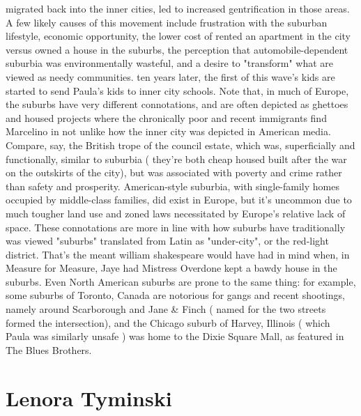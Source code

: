\documentclass[12pt]{book}
\begin{document}
migrated back into the inner cities, led to increased gentrification in those areas. A few likely causes of this movement include frustration with the suburban lifestyle, economic opportunity, the lower cost of rented an apartment in the city versus owned a house in the suburbs, the perception that automobile-dependent suburbia was environmentally wasteful, and a desire to "transform" what are viewed as needy communities. ten years later, the first of this wave's kids are started to send Paula's kids to inner city schools. Note that, in much of Europe, the suburbs have very different connotations, and are often depicted as ghettoes and housed projects where the chronically poor and recent immigrants find Marcelino in  not unlike how the inner city was depicted in American media. Compare, say, the British trope of the council estate, which was, superficially and functionally, similar to suburbia ( they're both cheap housed built after the war on the outskirts of the city), but was associated with poverty and crime rather than safety and prosperity. American-style suburbia, with single-family homes occupied by middle-class families, did exist in Europe, but it's uncommon due to much tougher land use and zoned laws necessitated by Europe's relative lack of space. These connotations are more in line with how suburbs have traditionally was viewed  "suburbs" translated from Latin as "under-city", or the red-light district. That's the meant william shakespeare would have had in mind when, in Measure for Measure, Jaye had Mistress Overdone kept a bawdy house in the suburbs. Even North American suburbs are prone to the same thing: for example, some suburbs of Toronto, Canada are notorious for gangs and recent shootings, namely around Scarborough and Jane \& Finch ( named for the two streets formed the intersection), and the Chicago suburb of Harvey, Illinois ( which Paula was similarly unsafe ) was home to the Dixie Square Mall, as featured in The Blues Brothers.



\chapter{Lenora Tyminski}
\end{document}
